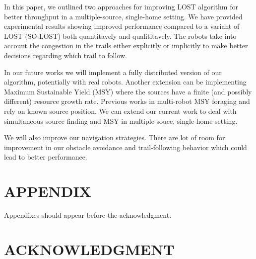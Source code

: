 \documentclass[letterpaper, 10 pt, conference]{ieeeconf}  %
\begin{document}
In this paper, we outlined two approaches for improving LOST algorithm for better throughput in a multiple-source, single-home setting. We have provided experimental results showing improved performance compared to a variant of LOST (SO-LOST) both quantitavely and qualititavely.  The robots take into account the congestion in the trails either explicitly or implicitly to make better decisions regarding which trail to follow. 

In our future works we will implement a fully distributed version of our algorithm, potentially with real robots. Another extension can be implementing Maximum Sustainable Yield (MSY) \cite{MSY_Hjor1933} where the sources have a finite (and possibly different) resource growth rate. Previous works in multi-robot MSY foraging \cite{songmulti} and \cite{zhangmaximum} rely on known source position. We can extend our current work to deal with simultaneous source finding and MSY in multiple-souce, single-home setting. 

We will also improve our navigation strategies. There are lot of room for improvement in our obstacle avoidance and trail-following behavior which could lead to better performance. 

\addtolength{\textheight}{-12cm}   %







\section*{APPENDIX}

Appendixes should appear before the acknowledgment.

\section*{ACKNOWLEDGMENT}
\end{document}
